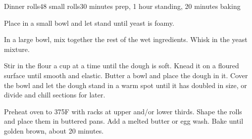 \documentclass[../Cookbook.tex]{subfiles}
\begin{document}
\begin{recipe}{Dinner rolls}{48 small rolls}{30 minutes prep, 1 hour standing, 20 minutes baking}

Place in a small bowl and let stand until yeast is foamy.

In a large bowl, mix together the rest of the wet ingredients. Whisk in the yeast mixture.

Stir in the flour a cup at a time until the dough is soft. Knead it on a floured surface until smooth and elastic. Butter a bowl and place the dough in it. Cover the bowl and let the dough stand in a warm spot until it has doubled in size, or divide and chill sections for later.

\newstep
Preheat oven to 375\0F with racks at upper and/or lower thirds. Shape the rolls and place them in buttered pans. Add a melted butter or egg wash. Bake until golden brown, about 20 minutes.

\end{recipe}
\end{document}
